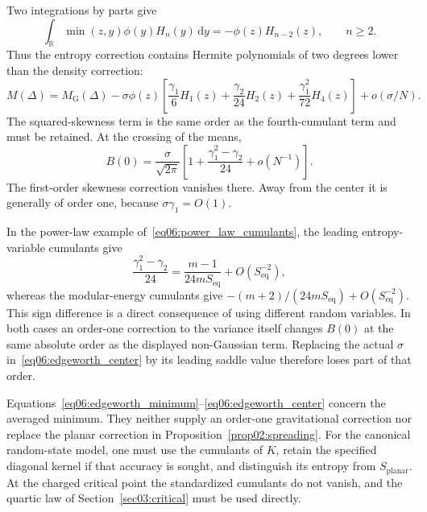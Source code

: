 \documentclass[11pt,letterpaper]{article}
\newcommand{\dd}{\mathrm{d}}
\theoremstyle{plain}
\theoremstyle{definition}
\theoremstyle{remark}
\begin{document}
Two integrations by parts give
\begin{equation}
 \int_{\mathbb R}\min(z,y)\phi(y)H_n(y)\,\dd y
 =-\phi(z)H_{n-2}(z),\qquad n\geq2.
 \label{eq06:hermite_integral}
\end{equation}
Thus the entropy correction contains Hermite polynomials of two degrees lower than the density correction:
\begin{equation}
 M(\Delta)=M_{\mathrm G}(\Delta)
 -\sigma\phi(z)\left[
 \frac{\gamma_1}{6}H_1(z)
 +\frac{\gamma_2}{24}H_2(z)
 +\frac{\gamma_1^2}{72}H_4(z)\right]
 +o(\sigma/N).
 \label{eq06:edgeworth_minimum}
\end{equation}
The squared-skewness term is the same order as the fourth-cumulant term and must be retained. At the crossing of the means,
\begin{equation}
 B(0)=\frac{\sigma}{\sqrt{2\pi}}
 \left[1+\frac{\gamma_1^2-\gamma_2}{24}
 +o(N^{-1})\right].
 \label{eq06:edgeworth_center}
\end{equation}
The first-order skewness correction vanishes there. Away from the center it is generally of order one, because $\sigma\gamma_1=O(1)$.

In the power-law example of~\eqref{eq06:power_law_cumulants}, the leading entropy-variable cumulants give
\begin{equation}
 \frac{\gamma_1^2-\gamma_2}{24}
 =\frac{m-1}{24mS_{\mathrm{eq}}}+O(S_{\mathrm{eq}}^{-2}),
 \label{eq06:power_law_entropy_correction}
\end{equation}
whereas the modular-energy cumulants give $-(m+2)/(24mS_{\mathrm{eq}})+O(S_{\mathrm{eq}}^{-2})$. This sign difference is a direct consequence of using different random variables. In both cases an order-one correction to the variance itself changes $B(0)$ at the same absolute order as the displayed non-Gaussian term. Replacing the actual $\sigma$ in~\eqref{eq06:edgeworth_center} by its leading saddle value therefore loses part of that order.

Equations~\eqref{eq06:edgeworth_minimum}--\eqref{eq06:edgeworth_center} concern the averaged minimum. They neither supply an order-one gravitational correction nor replace the planar correction in Proposition~\ref{prop02:spreading}. For the canonical random-state model, one must use the cumulants of $K$, retain the specified diagonal kernel if that accuracy is sought, and distinguish its entropy from $S_{\mathrm{planar}}$. At the charged critical point the standardized cumulants do not vanish, and the quartic law of Section~\ref{sec03:critical} must be used directly.
\end{document}
